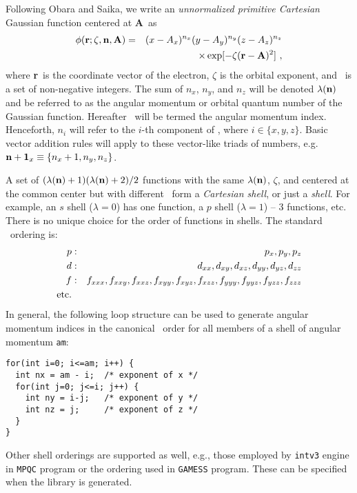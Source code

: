 \documentclass[12pt]{article}
\begin{document}
Following Obara and Saika,\cite{Obara86}
we write an {\em unnormalized primitive Cartesian} Gaussian function centered at {\bf A}\ as
\begin{eqnarray}
\phi ({\bf r}; \zeta, {\bf n}, {\bf A}) & = & (x - A_x)^{n_x} (y - A_y)^{n_y} (z - A_z)^{n_z} \nonumber \\
& & \times \exp [-\zeta({\bf r}-{\bf A})^2]\ ,
\end{eqnarray}
where {\bf r}\ is the coordinate vector of the electron, $\zeta$ is the orbital exponent, and
\n\ is a set of non-negative integers. The sum of $n_x$, $n_y$, and $n_z$ will be denoted $\lambda({\bf n})$
and be referred to as the angular momentum or orbital quantum number of the Gaussian function.
Hereafter \n\ will be termed the angular momentum index.
Henceforth, $n_i$ will refer to the $i$-th component of \n, where $i \in \{x, y, z\}$.
Basic vector addition rules will apply to these vector-like triads of numbers, e.g.
${\bf n} + {\bf 1}_x \equiv \{ n_x+1, n_y, n_z\}$.

A set of $(\lambda({\bf n}) + 1)(\lambda({\bf n}) + 2)/2$ functions with the same $\lambda({\bf n})$, $\zeta$, and centered
at the common center
but with different \n\ form a {\em Cartesian shell},
or just a {\em shell}. For example, an $s$ shell ($\lambda=0$) has one function, a $p$ shell ($\lambda=1$) --
3 functions, etc.
There is no unique choice for the order of functions in shells.
The standard \LIBINT\ ordering is:
\begin{eqnarray}
p & : & p_x, p_y, p_z \nonumber \\
d & : & d_{xx}, d_{xy}, d_{xz}, d_{yy}, d_{yz}, d_{zz} \nonumber \\
f & : & f_{xxx}, f_{xxy}, f_{xxz}, f_{xyy}, f_{xyz}, f_{xzz}, f_{yyy}, f_{yyz}, f_{yzz}, f_{zzz} \nonumber \\
{\rm etc.} \nonumber
\end{eqnarray}
In general, the following loop structure can be used to generate angular momentum indices in the canonical \LIBINT\ order for all
members of a shell of angular momentum {\tt am}:
\begin{verbatim}
for(int i=0; i<=am; i++) {
  int nx = am - i;  /* exponent of x */
  for(int j=0; j<=i; j++) {
    int ny = i-j;   /* exponent of y */
    int nz = j;     /* exponent of z */
  }
}
\end{verbatim}
Other shell orderings are supported as well, e.g., those employed by {\tt intv3} engine in {\tt MPQC} program
or the ordering used in {\tt GAMESS} program. These can be specified when the library is generated.
\end{document}
